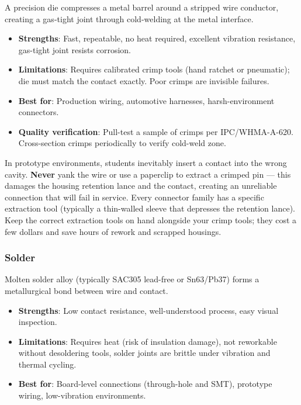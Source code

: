 \documentclass[11pt,letterpaper,twoside,openany]{book}
\begin{document}
A precision die compresses a metal barrel around a stripped wire conductor, creating a gas-tight joint through cold-welding at the metal interface.

\begin{itemize}[nosep,leftmargin=1.5em]
  \item \textbf{Strengths}: Fast, repeatable, no heat required, excellent vibration resistance, gas-tight joint resists corrosion.
  \item \textbf{Limitations}: Requires calibrated crimp tools (hand ratchet or pneumatic); die must match the contact exactly. Poor crimps are invisible failures.
  \item \textbf{Best for}: Production wiring, automotive harnesses, harsh-environment connectors.
  \item \textbf{Quality verification}: Pull-test a sample of crimps per IPC/WHMA-A-620. Cross-section crimps periodically to verify cold-weld zone.
\end{itemize}

\begin{warningbox}
In prototype environments, students inevitably insert a contact into the wrong cavity. \textbf{Never} yank the wire or use a paperclip to extract a crimped pin --- this damages the housing retention lance and the contact, creating an unreliable connection that will fail in service. Every connector family has a specific extraction tool (typically a thin-walled sleeve that depresses the retention lance). Keep the correct extraction tools on hand alongside your crimp tools; they cost a few dollars and save hours of rework and scrapped housings.
\end{warningbox}

\subsubsection{Solder}

Molten solder alloy (typically SAC305 lead-free or Sn63/Pb37) forms a metallurgical bond between wire and contact.

\begin{itemize}[nosep,leftmargin=1.5em]
  \item \textbf{Strengths}: Low contact resistance, well-understood process, easy visual inspection.
  \item \textbf{Limitations}: Requires heat (risk of insulation damage), not reworkable without desoldering tools, solder joints are brittle under vibration and thermal cycling.
  \item \textbf{Best for}: Board-level connections (through-hole and SMT), prototype wiring, low-vibration environments.
\end{itemize}
\end{document}
